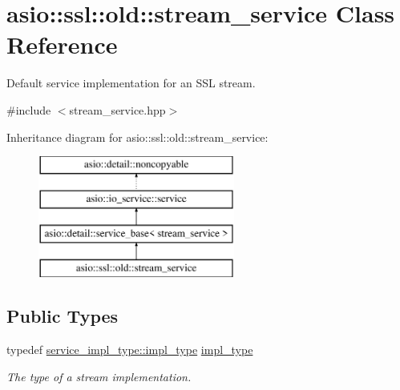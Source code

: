 \hypertarget{classasio_1_1ssl_1_1old_1_1stream__service}{}\section{asio\+:\+:ssl\+:\+:old\+:\+:stream\+\_\+service Class Reference}
\label{classasio_1_1ssl_1_1old_1_1stream__service}


Default service implementation for an S\+S\+L stream.  




{\ttfamily \#include $<$stream\+\_\+service.\+hpp$>$}

Inheritance diagram for asio\+:\+:ssl\+:\+:old\+:\+:stream\+\_\+service\+:\begin{figure}[H]
\begin{center}
\leavevmode
\includegraphics[height=4.000000cm]{classasio_1_1ssl_1_1old_1_1stream__service}
\end{center}
\end{figure}
\subsection*{Public Types}
\begin{DoxyCompactItemize}
\item 
typedef \hyperlink{classasio_1_1ssl_1_1old_1_1detail_1_1openssl__stream__service_a2419fd5a889197ed63b6d0bd14656027}{service\+\_\+impl\+\_\+type\+::impl\+\_\+type} \hyperlink{classasio_1_1ssl_1_1old_1_1stream__service_a7e2131ccd16fbc04d0f86c61288e4175}{impl\+\_\+type}
\begin{DoxyCompactList}\small\item\em The type of a stream implementation. \end{DoxyCompactList}\end{DoxyCompactItemize}
